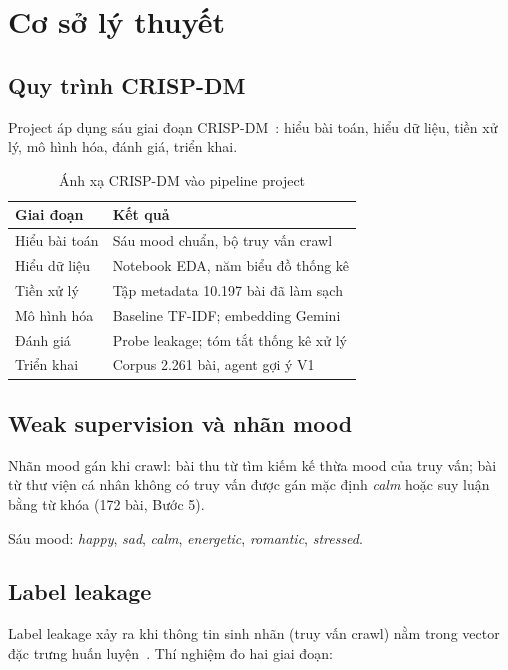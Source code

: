 \chapter{Cơ sở lý thuyết}
\label{ch:lythuyet}

\section{Quy trình CRISP-DM}

Project áp dụng sáu giai đoạn CRISP-DM~\cite{crispdm2000}: hiểu bài toán, hiểu dữ liệu, tiền xử lý, mô hình hóa, đánh giá, triển khai.

\begin{table}[htbp]
  \centering
  \caption{Ánh xạ CRISP-DM vào pipeline project}
  \label{tab:crispdm}
  \begin{tabularx}{\textwidth}{@{}L{3.2cm}X@{}}
    \toprule
    \textbf{Giai đoạn} & \textbf{Kết quả} \\
    \midrule
    Hiểu bài toán & Sáu mood chuẩn, bộ truy vấn crawl \\
    Hiểu dữ liệu & Notebook EDA, năm biểu đồ thống kê \\
    Tiền xử lý & Tập metadata 10.197 bài đã làm sạch \\
    Mô hình hóa & Baseline TF-IDF; embedding Gemini \\
    Đánh giá & Probe leakage; tóm tắt thống kê xử lý \\
    Triển khai & Corpus 2.261 bài, agent gợi ý V1 \\
    \bottomrule
  \end{tabularx}
\end{table}

\section{Weak supervision và nhãn mood}

Nhãn mood gán khi crawl: bài thu từ tìm kiếm kế thừa mood của truy vấn; bài từ thư viện cá nhân không có truy vấn được gán mặc định \textit{calm} hoặc suy luận bằng từ khóa (172 bài, Bước 5).

Sáu mood: \textit{happy}, \textit{sad}, \textit{calm}, \textit{energetic}, \textit{romantic}, \textit{stressed}.

\section{Label leakage}

Label leakage xảy ra khi thông tin sinh nhãn (truy vấn crawl) nằm trong vector đặc trưng huấn luyện~\cite{leakage2023}. Thí nghiệm đo hai giai đoạn:

